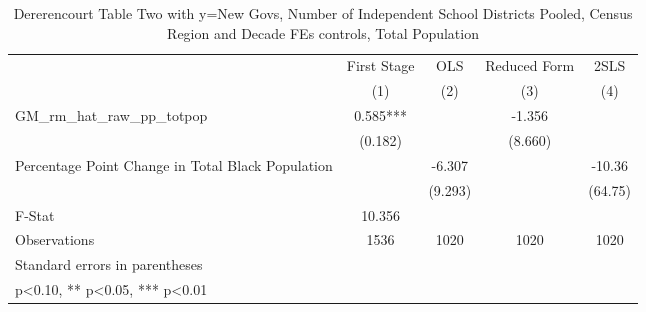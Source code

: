 \begin{table}[htbp]\centering
\def\sym#1{\ifmmode^{#1}\else\(^{#1}\)\fi}
\caption{Dererencourt Table Two with y=New Govs, Number of Independent School Districts  Pooled, Census Region and Decade FEs controls, Total Population}
\begin{tabular}{l*{4}{c}}
\toprule
                    & First Stage   &         OLS   &Reduced Form   &        2SLS   \\
                    &\multicolumn{1}{c}{(1)}   &\multicolumn{1}{c}{(2)}   &\multicolumn{1}{c}{(3)}   &\multicolumn{1}{c}{(4)}   \\
\midrule
GM\_rm\_hat\_raw\_pp\_totpop&       0.585***&               &      -1.356   &               \\
                    &     (0.182)   &               &     (8.660)   &               \\
\addlinespace
Percentage Point Change in Total Black Population&               &      -6.307   &               &      -10.36   \\
                    &               &     (9.293)   &               &     (64.75)   \\
\midrule
F-Stat              &      10.356   &               &               &               \\
Observations        &        1536   &        1020   &        1020   &        1020   \\
\bottomrule
\multicolumn{5}{l}{\footnotesize Standard errors in parentheses}\\
\multicolumn{5}{l}{\footnotesize * p<0.10, ** p<0.05, *** p<0.01}\\
\end{tabular}
\end{table}
